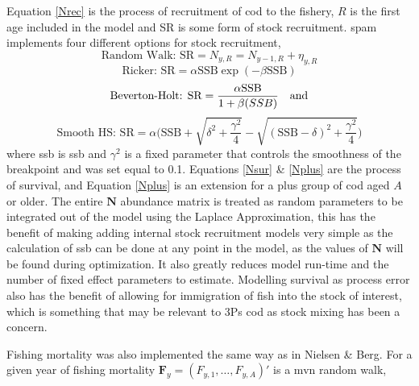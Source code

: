 \documentclass[11pt]{article}\usepackage[]{graphicx}\usepackage[]{color}
\begin{document}
Equation \ref{Nrec} is the process of recruitment of cod to the fishery, $R$ is the first age included in the model and SR is some form of stock recruitment. \acrshort{spam} implements four different options for stock recruitment, 
\begin{equation}\label{rw}
  \text{Random Walk: } \text{SR} = N_{y,R} = N_{y-1,R} + \eta_{y,R}
\end{equation}
\begin{equation}\label{ricker}
  \text{Ricker: } \text{SR} = \alpha\text{SSB}\exp(-\beta\text{SSB})
\end{equation}
\begin{equation}\label{BH}
  \text{Beverton-Holt: } \text{SR} = \frac{\alpha\text{SSB}}{1+\beta\text(SSB)} \quad \text{and}  	
\end{equation}
\begin{equation}
  \text{Smooth HS: }\text{SR} = \alpha \bigg( \text{SSB} + \sqrt{\delta^2 + \frac{\gamma^2}{4}} 
  - \sqrt{(\text{SSB} - \delta)^2 + \frac{\gamma^2}{4}}\bigg)
\end{equation}
where \acrshort{ssb} is \acrfull{ssb} and $\gamma^2$ is a fixed parameter that controls the smoothness of the breakpoint and was set equal to 0.1. Equations \ref{Nsur} \& \ref{Nplus} are the process of survival, and Equation \ref{Nplus} is an extension for a plus group of cod aged $A$ or older. The entire $\bm{N}$ abundance matrix is treated as random parameters to be integrated out of the model using the Laplace Approximation, this has the benefit of making adding internal stock recruitment models very simple as the calculation of \acrshort{ssb} can be done at any point in the model, as the values of $\bm{N}$ will be found during optimization. It also greatly reduces model run-time and the number of fixed effect parameters to estimate. Modelling survival as process error also has the benefit of allowing for immigration of fish into the stock of interest, which is something that may be relevant to 3Ps cod as stock mixing has been a concern\cite{methot2005spatio}\cite{rideout2017assessing}.

Fishing mortality was also implemented the same way as in Nielsen \& Berg\cite{Nielsen2014Estimation-of-t}. For a given year of fishing mortality $\bm{F}_y=(F_{y,1},\dots,F_{y,A})'$ is a \acrfull{mvn} random walk, 
\end{document}
